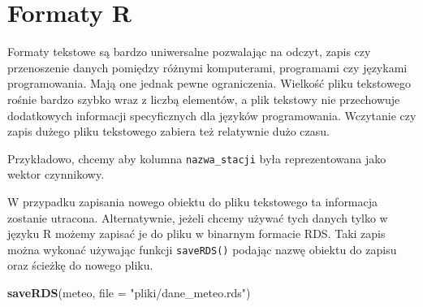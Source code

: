 \documentclass[paper=6in:9in,pagesize=pdftex,headinclude=on,footinclude=on,10pt]{scrbook}
\newenvironment{Shaded}{\begin{snugshade}}{\end{snugshade}}
\newcommand{\CommentTok}[1]{\textcolor[rgb]{0.56,0.35,0.01}{\textit{#1}}}
\newcommand{\DataTypeTok}[1]{\textcolor[rgb]{0.13,0.29,0.53}{#1}}
\newcommand{\KeywordTok}[1]{\textcolor[rgb]{0.13,0.29,0.53}{\textbf{#1}}}
\newcommand{\NormalTok}[1]{#1}
\newcommand{\OperatorTok}[1]{\textcolor[rgb]{0.81,0.36,0.00}{\textbf{#1}}}
\newcommand{\StringTok}[1]{\textcolor[rgb]{0.31,0.60,0.02}{#1}}
\begin{document}
\hypertarget{formaty-r}{%
\section{Formaty R}\label{formaty-r}}

Formaty tekstowe są bardzo uniwersalne pozwalając na odczyt, zapis czy przenoszenie danych pomiędzy różnymi komputerami, programami czy językami programowania.
Mają one jednak pewne ograniczenia.
Wielkość pliku tekstowego rośnie bardzo szybko wraz z liczbą elementów, a plik tekstowy nie przechowuje dodatkowych informacji specyficznych dla języków programowania.
Wczytanie czy zapis dużego pliku tekstowego zabiera też relatywnie dużo czasu.

Przykładowo, chcemy aby kolumna \texttt{nazwa\_stacji} była reprezentowana jako wektor czynnikowy.

\begin{Shaded}
\end{Shaded}

W przypadku zapisania nowego obiektu do pliku tekstowego ta informacja zostanie utracona.
Alternatywnie, jeżeli chcemy używać tych danych tylko w języku R możemy zapisać je do pliku w binarnym formacie RDS.
Taki zapis można wykonać używając funkcji \texttt{saveRDS()} podając nazwę obiektu do zapisu oraz ścieżkę do nowego pliku.

\begin{Shaded}
\begin{Highlighting}[]
\KeywordTok{saveRDS}\NormalTok{(meteo, }\DataTypeTok{file =} \StringTok{"pliki/dane_meteo.rds"}\NormalTok{)}
\end{Highlighting}
\end{Shaded}
\end{document}
